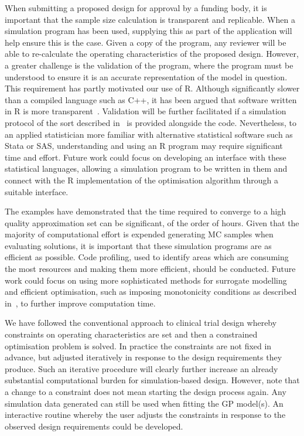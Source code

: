 \documentclass{article} %
\begin{document}
When submitting a proposed design for approval by a funding body, it is important that the sample size calculation is transparent and replicable. When a simulation program has been used, supplying this as part of the application will help ensure this is the case. Given a copy of the program, any reviewer will be able to re-calculate the operating characteristics of the proposed design. However, a greater challenge is the validation of the program, where the program must be understood to ensure it is an accurate representation of the model in question. This requirement has partly motivated our use of R. Although significantly slower than a compiled language such as C++, it has been argued that software written in R is more transparent~\cite{Smith2010}. Validation will be further facilitated if a simulation protocol of the sort described in~\cite{Smith2010} is provided alongside the code. Nevertheless, to an applied statistician more familiar with alternative statistical software such as Stata or SAS, understanding and using an R program may require significant time and effort. Future work could focus on developing an interface with these statistical languages, allowing a simulation program to be written in them and connect with the R implementation of the optimisation algorithm through a suitable interface.

The examples have demonstrated that the time required to converge to a high quality approximation set can be significant, of the order of hours. Given that the majority of computational effort is expended generating MC samples when evaluating solutions, it is important that these simulation programs are as efficient as possible. Code profiling, used to identify areas which are consuming the most resources and making them more efficient, should be conducted. Future work could focus on using more sophisticated methods for surrogate modelling and efficient optimisation, such as imposing monotonicity conditions as described in~\cite{Emmerich2011}, to further improve computation time.

We have followed the conventional approach to clinical trial design whereby constraints on operating characteristics are set and then a constrained optimisation problem is solved. In practice the constraints are not fixed in advance, but adjusted iteratively in response to the design requirements they produce. Such an iterative procedure will clearly further increase an already substantial computational burden for simulation-based design. However, note that a change to a constraint does not mean starting the design process again. Any simulation data generated can still be used when fitting the GP model(s). An interactive routine whereby the user adjusts the constraints in response to the observed design requirements could be developed.
\end{document}

